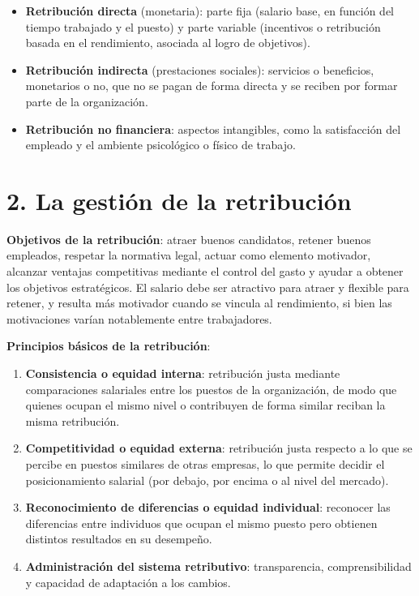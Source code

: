 \documentclass[12pt]{book} %
\providecommand{\tightlist}{%
  \setlength{\itemsep}{0pt}\setlength{\parskip}{0pt}}
\begin{document}
\begin{itemize}
\tightlist
\item
  \textbf{Retribución directa} (monetaria): parte fija (salario base, en
  función del tiempo trabajado y el puesto) y parte variable (incentivos
  o retribución basada en el rendimiento, asociada al logro de
  objetivos).
\item
  \textbf{Retribución indirecta} (prestaciones sociales): servicios o
  beneficios, monetarios o no, que no se pagan de forma directa y se
  reciben por formar parte de la organización.
\item
  \textbf{Retribución no financiera}: aspectos intangibles, como la
  satisfacción del empleado y el ambiente psicológico o físico de
  trabajo.
\end{itemize}

\hypertarget{la-gestiuxf3n-de-la-retribuciuxf3n}{%
\section{2. La gestión de la
retribución}\label{la-gestiuxf3n-de-la-retribuciuxf3n}}

\textbf{Objetivos de la retribución}: atraer buenos candidatos, retener
buenos empleados, respetar la normativa legal, actuar como elemento
motivador, alcanzar ventajas competitivas mediante el control del gasto
y ayudar a obtener los objetivos estratégicos. El salario debe ser
atractivo para atraer y flexible para retener, y resulta más motivador
cuando se vincula al rendimiento, si bien las motivaciones varían
notablemente entre trabajadores.

\textbf{Principios básicos de la retribución}:

\begin{enumerate}
\def\labelenumi{\arabic{enumi}.}
\tightlist
\item
  \textbf{Consistencia o equidad interna}: retribución justa mediante
  comparaciones salariales entre los puestos de la organización, de modo
  que quienes ocupan el mismo nivel o contribuyen de forma similar
  reciban la misma retribución.
\item
  \textbf{Competitividad o equidad externa}: retribución justa respecto
  a lo que se percibe en puestos similares de otras empresas, lo que
  permite decidir el posicionamiento salarial (por debajo, por encima o
  al nivel del mercado).
\item
  \textbf{Reconocimiento de diferencias o equidad individual}: reconocer
  las diferencias entre individuos que ocupan el mismo puesto pero
  obtienen distintos resultados en su desempeño.
\item
  \textbf{Administración del sistema retributivo}: transparencia,
  comprensibilidad y capacidad de adaptación a los cambios.
\end{enumerate}
\end{document}
